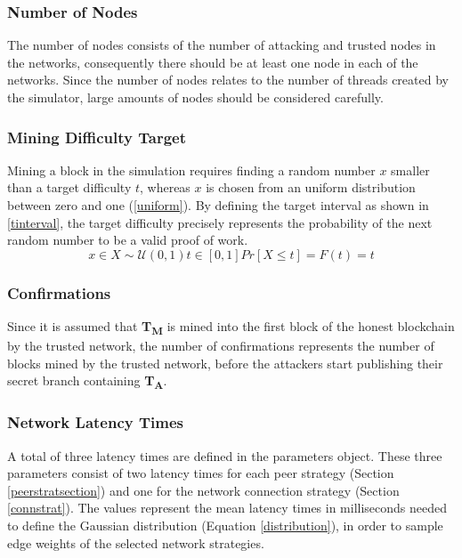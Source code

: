 \documentclass[a4paper,12pt,twoside]{report}
\begin{document}
\subsubsection{Number of Nodes}
The number of nodes consists of the number of attacking and trusted nodes in the networks, consequently there should be at least one node in each of the networks. Since the number of nodes relates to the number of threads created by the simulator, large amounts of nodes should be considered carefully.
\subsubsection{Mining Difficulty Target}
Mining a block in the simulation requires finding a random number $x$ smaller than a target difficulty $t$, whereas $x$ is chosen from an uniform distribution between zero and one (\autoref{uniform}). By defining the target interval as shown in \autoref{tinterval}, the target difficulty precisely represents the probability of the next random number to be a valid proof of work.
\begin{subequations}
\begin{equation}\label{uniform}
x \in X\sim \mathcal{U}(0,1)
\end{equation}
\begin{equation}\label{tinterval}
t \in [0,1]
\end{equation}
\begin{equation}\label{probability}
Pr[X \leq t] = F(t) = t
\end{equation}
\end{subequations}
\subsubsection{Confirmations}
Since it is assumed that \textbf{T\textsubscript{M}} is mined into the first block of the honest blockchain by the trusted network, the number of confirmations represents the number of blocks mined by the trusted network, before the attackers start publishing their secret branch containing \textbf{T\textsubscript{A}}.
\subsubsection{Network Latency Times}
A total of three latency times are defined in the parameters object. These three parameters consist of two latency times for each peer strategy (Section \ref{peerstratsection}) and one for the network connection strategy (Section \ref{connstrat}). The values represent the mean latency times in milliseconds needed to define the Gaussian distribution (Equation \ref{distribution}), in order to sample edge weights of the selected network strategies.
\end{document}
